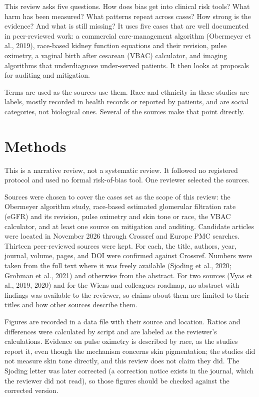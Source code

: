 \documentclass[12pt]{article}
\begin{document}
This review asks five questions. How does bias get into clinical risk tools? What harm has been measured? What patterns repeat across cases? How strong is the evidence? And what is still missing? It uses five cases that are well documented in peer-reviewed work: a commercial care-management algorithm (Obermeyer et al., 2019), race-based kidney function equations and their revision, pulse oximetry, a vaginal birth after cesarean (VBAC) calculator, and imaging algorithms that underdiagnose under-served patients. It then looks at proposals for auditing and mitigation.

Terms are used as the sources use them. Race and ethnicity in these studies are labels, mostly recorded in health records or reported by patients, and are social categories, not biological ones. Several of the sources make that point directly.

\section*{Methods}
This is a narrative review, not a systematic review. It followed no registered protocol and used no formal risk-of-bias tool. One reviewer selected the sources.

Sources were chosen to cover the cases set as the scope of this review: the Obermeyer algorithm study, race-based estimated glomerular filtration rate (eGFR) and its revision, pulse oximetry and skin tone or race, the VBAC calculator, and at least one source on mitigation and auditing. Candidate articles were located in November 2026 through Crossref and Europe PMC searches. Thirteen peer-reviewed sources were kept. For each, the title, authors, year, journal, volume, pages, and DOI were confirmed against Crossref. Numbers were taken from the full text where it was freely available (Sjoding et al., 2020; Grobman et al., 2021) and otherwise from the abstract. For two sources (Vyas et al., 2019, 2020) and for the Wiens and colleagues roadmap, no abstract with findings was available to the reviewer, so claims about them are limited to their titles and how other sources describe them.

Figures are recorded in a data file with their source and location. Ratios and differences were calculated by script and are labeled as the reviewer's calculations. Evidence on pulse oximetry is described by race, as the studies report it, even though the mechanism concerns skin pigmentation; the studies did not measure skin tone directly, and this review does not claim they did. The Sjoding letter was later corrected (a correction notice exists in the journal, which the reviewer did not read), so those figures should be checked against the corrected version.
\end{document}
